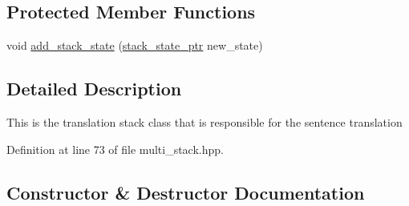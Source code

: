 \subsection*{Protected Member Functions}
\begin{DoxyCompactItemize}
\item 
void \hyperlink{classuva_1_1smt_1_1bpbd_1_1server_1_1decoder_1_1stack_1_1multi__stack_ae582260425775ffcad90927c89767df6}{add\+\_\+stack\+\_\+state} (\hyperlink{namespaceuva_1_1smt_1_1bpbd_1_1server_1_1decoder_1_1stack_ab08047a5fae45b1c4311bd5d5aa2c4fc}{stack\+\_\+state\+\_\+ptr} new\+\_\+state)
\end{DoxyCompactItemize}


\subsection{Detailed Description}
This is the translation stack class that is responsible for the sentence translation 

Definition at line 73 of file multi\+\_\+stack.\+hpp.



\subsection{Constructor \& Destructor Documentation}
\hypertarget{classuva_1_1smt_1_1bpbd_1_1server_1_1decoder_1_1stack_1_1multi__stack_a227be04b3dca60a5bb7abc8b6b385bda}{}
